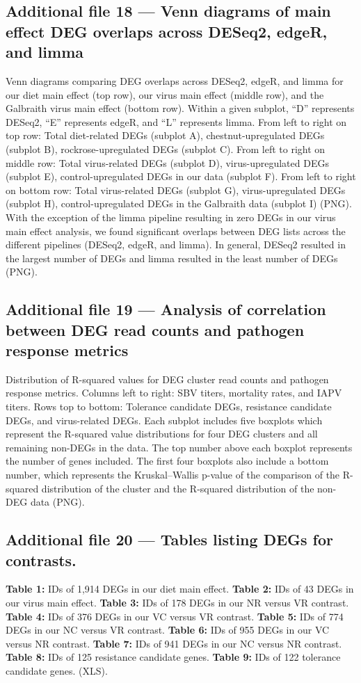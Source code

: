 \documentclass{bmcart}
\begin{document}
\begin{linenumbers}
\begin{backmatter}
   \subsection*{Additional file 18 --- Venn diagrams of main effect DEG overlaps across DESeq2, edgeR, and limma}
  Venn diagrams comparing DEG overlaps across DESeq2, edgeR, and limma for our diet main effect (top row), our virus main effect (middle row), and the Galbraith virus main effect (bottom row). Within a given subplot, ``D'' represents DESeq2, ``E'' represents edgeR, and ``L'' represents limma. From left to right on top row: Total diet-related DEGs (subplot A), chestnut-upregulated DEGs (subplot B), rockrose-upregulated DEGs (subplot C). From left to right on middle row: Total virus-related DEGs (subplot D), virus-upregulated DEGs (subplot E), control-upregulated DEGs in our data (subplot F). From left to right on bottom row: Total virus-related DEGs (subplot G), virus-upregulated DEGs (subplot H), control-upregulated DEGs in the Galbraith data (subplot I) (PNG). With the exception of the limma pipeline resulting in zero DEGs in our virus main effect analysis, we found significant overlaps between DEG lists across the different pipelines (DESeq2, edgeR, and limma). In general, DESeq2 resulted in the largest number of DEGs and limma resulted in the least number of DEGs (PNG). 
  
  \subsection*{Additional file 19 --- Analysis of correlation between DEG read counts and pathogen response metrics}
  Distribution of R-squared values for DEG cluster read counts and pathogen response metrics. Columns left to right: SBV titers, mortality rates, and IAPV titers. Rows top to bottom: Tolerance candidate DEGs, resistance candidate DEGs, and virus-related DEGs. Each subplot includes five boxplots which represent the R-squared value distributions for four DEG clusters and all remaining non-DEGs in the data. The top number above each boxplot represents the number of genes included. The first four boxplots also include a bottom number, which represents the Kruskal–Wallis p-value of the comparison of the R-squared distribution of the cluster and the R-squared distribution of the non-DEG data (PNG).
  
  \subsection*{Additional file 20 --- Tables listing DEGs for contrasts.}
    \textbf{Table 1:} IDs of 1,914 DEGs in our diet main effect.
    \textbf{Table 2:} IDs of 43 DEGs in our virus main effect.
    \textbf{Table 3:} IDs of 178 DEGs in our NR versus VR contrast.
    \textbf{Table 4:} IDs of 376 DEGs in our VC versus VR contrast.
    \textbf{Table 5:} IDs of 774 DEGs in our NC versus VR contrast.
    \textbf{Table 6:} IDs of 955 DEGs in our VC versus NR contrast. 
    \textbf{Table 7:} IDs of 941 DEGs in our NC versus NR contrast. 
    \textbf{Table 8:} IDs of 125 resistance candidate genes.
    \textbf{Table 9:} IDs of 122 tolerance candidate genes. (XLS).
  

\end{backmatter}
\end{linenumbers}
\end{document}
